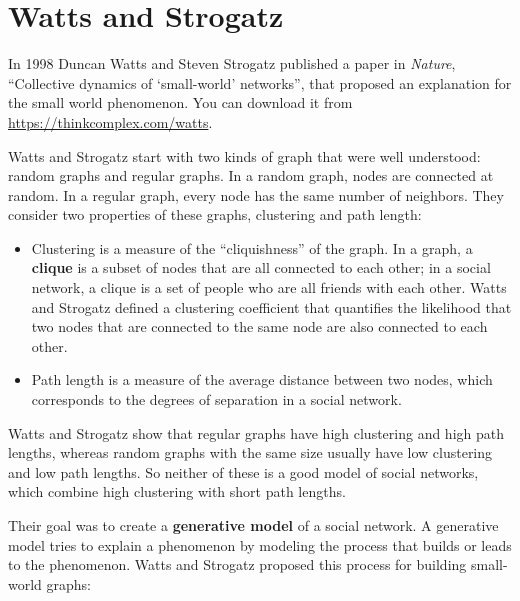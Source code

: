\documentclass[12pt]{book}
\theoremstyle{exercise}
\begin{document}


\section{Watts and Strogatz}
\label{watts}

In 1998 Duncan Watts and Steven Strogatz published a paper in {\em
  Nature}, ``Collective dynamics of `small-world' networks'', that
proposed an explanation for the small world phenomenon.  You can
download it from
\url{https://thinkcomplex.com/watts}.


Watts and Strogatz start with two kinds of graph that were well
understood: random graphs and regular graphs.  In a random graph, nodes
are connected at random.  In a regular graph, every node has the
same number of neighbors.
They consider two
properties of these graphs, clustering and path length:


\begin{itemize}

\item Clustering is a measure of the ``cliquishness'' of the graph.
In a graph, a {\bf clique} is a subset of nodes that are
all connected to each other; in a social network, a clique is
a set of people who are all friends with each other.  Watts and Strogatz
defined a clustering coefficient that quantifies the likelihood
that two nodes that are connected to the same node are also
connected to each other.


\item Path length is a measure of the average distance between
two nodes, which corresponds to the degrees of separation in
a social network.

\end{itemize}

Watts and Strogatz show that regular graphs
have high clustering and high path lengths, whereas
random graphs with the same size usually have low clustering
and low path lengths.  So neither of these is a good model of
social networks, which combine high clustering with
short path lengths.

Their goal was to create a {\bf generative model} of a social
network.  A generative model tries to explain a phenomenon by
modeling the process that builds or leads to the phenomenon.
Watts and Strogatz proposed this process for building
small-world graphs:
\end{document}
